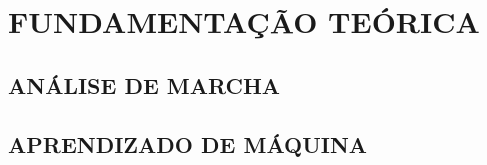 \chapter[FUNDAMENTAÇÃO TEÓRICA]{\textbf {FUNDAMENTAÇÃO TEÓRICA}}

\section{ANÁLISE DE MARCHA}






\section{APRENDIZADO DE MÁQUINA}


\begin{comment}

\end{comment}
